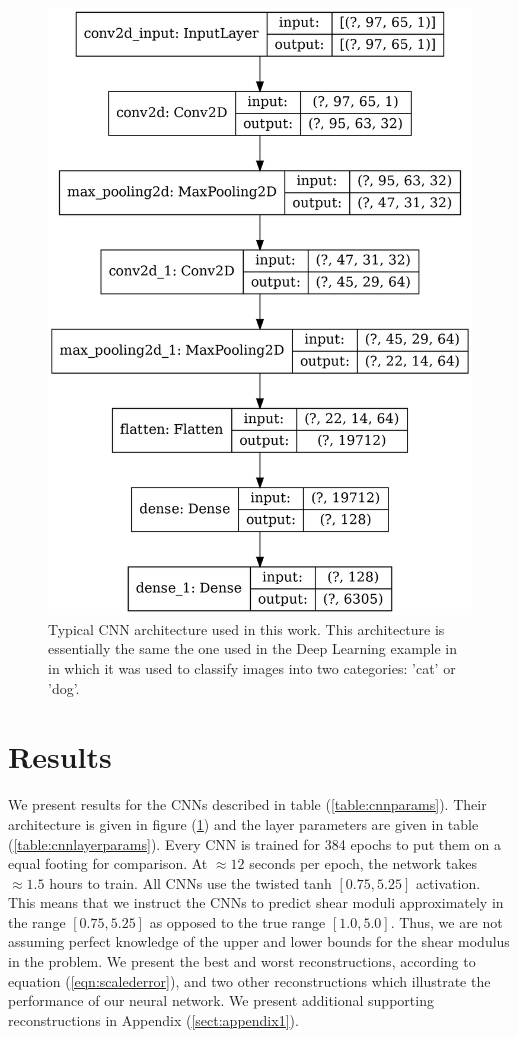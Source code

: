 \documentclass[12pt]{article}
\begin{document}
\begin{figure}[!h] 
   \centering
    \includegraphics[totalheight=9cm]{Figures/typical_cnn.png}
    \caption{\label{fig:typical_cnn}Typical CNN architecture used in this work. This architecture is essentially the same the one used in the Deep Learning example in \cite{misc:udemy} in which it was used to classify images into two categories: 'cat' or 'dog'.}
\end{figure}
%
%
\section{Results}
We present results for the CNNs described in table (\ref{table:cnnparams}). Their architecture is given in figure (\ref{fig:typical_cnn}) and the layer parameters are given in table (\ref{table:cnnlayerparams}). Every CNN is trained for 384 epochs to put them on a equal footing for comparison. At $\approx{12}$ seconds per epoch, the network takes $\approx{1.5}$ hours to train. All CNNs use the twisted tanh $[0.75,5.25]$ activation. This means that we instruct the CNNs to predict shear moduli approximately in the range $[0.75,5.25]$ as opposed to the true range $[1.0,5.0]$. Thus, we are not assuming perfect knowledge of the upper and lower bounds for the shear modulus in the problem. We present the best and worst reconstructions, according to equation (\ref{eqn:scalederror}), and two other reconstructions which illustrate the performance of our neural network. We present additional supporting reconstructions in Appendix (\ref{sect:appendix1}).
\end{document}
